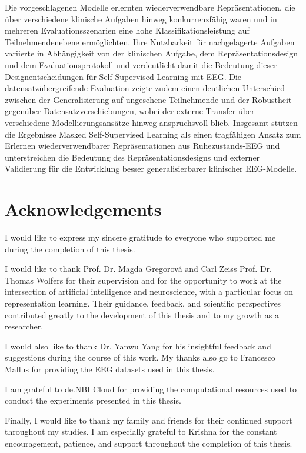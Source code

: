 Die vorgeschlagenen Modelle erlernten wiederverwendbare Repräsentationen, die über verschiedene klinische Aufgaben hinweg konkurrenzfähig waren und in mehreren Evaluationsszenarien eine hohe Klassifikationsleistung auf Teilnehmendenebene ermöglichten. Ihre Nutzbarkeit für nachgelagerte Aufgaben variierte in Abhängigkeit von der klinischen Aufgabe, dem Repräsentationsdesign und dem Evaluationsprotokoll und verdeutlicht damit die Bedeutung dieser Designentscheidungen für Self-Supervised Learning mit EEG. Die datensatzübergreifende Evaluation zeigte zudem einen deutlichen Unterschied zwischen der Generalisierung auf ungesehene Teilnehmende und der Robustheit gegenüber Datensatzverschiebungen, wobei der externe Transfer über verschiedene Modellierungsansätze hinweg anspruchsvoll blieb. Insgesamt stützen die Ergebnisse Masked Self-Supervised Learning als einen tragfähigen Ansatz zum Erlernen wiederverwendbarer Repräsentationen aus Ruhezustands-EEG und unterstreichen die Bedeutung des Repräsentationsdesigns und externer Validierung für die Entwicklung besser generalisierbarer klinischer EEG-Modelle.



\newpage
\chapter*{Acknowledgements}
%

I would like to express my sincere gratitude to everyone who supported me during the completion of this thesis.

I would like to thank Prof. Dr. Magda Gregorová and Carl Zeiss Prof. Dr. Thomas Wolfers for their supervision and for the opportunity to work at the intersection of artificial intelligence and neuroscience, with a particular focus on representation learning. Their guidance, feedback, and scientific perspectives contributed greatly to the development of this thesis and to my growth as a researcher.

I would also like to thank Dr. Yanwu Yang for his insightful feedback and suggestions during the course of this work. My thanks also go to Francesco Mallus for providing the EEG datasets used in this thesis.

I am grateful to de.NBI Cloud for providing the computational resources used to conduct the experiments presented in this thesis.

Finally, I would like to thank my family and friends for their continued support throughout my studies. I am especially grateful to Krishna for the constant encouragement, patience, and support throughout the completion of this thesis.

